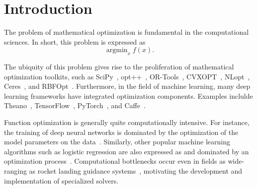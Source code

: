 \section{Introduction}
\label{sec:introduction}

The problem of mathematical optimization is fundamental in the computational
sciences.  In short, this problem is expressed as
%
\begin{equation}
\operatorname{argmin}_x f(x).
\end{equation}

The ubiquity of this problem gives rise to the proliferation of mathematical
optimization toolkits, such as SciPy~\cite{2019arXiv190710121V},
opt++~\cite{meza1994opt++},
OR-Tools~\cite{ortools}, CVXOPT~\cite{vandenberghe2010cvxopt},
NLopt~\cite{johnson2014nlopt}, Ceres~\cite{ceres-solver},
and RBFOpt~\cite{costa2018rbfopt}.
Furthermore, in the field of machine learning, many
deep learning frameworks have integrated optimization
components.  Examples inclulde Theano~\cite{2016arXiv160502688},
TensorFlow~\cite{tensorflow2015-whitepaper}, PyTorch~\cite{NEURIPS2019_9015},
and Caffe~\cite{jia2014caffe}.

Function optimization is generally quite computationally intensive.
For instance, the training of deep neural networks is dominated by
the optimization of the model parameters on the
data~\cite{krizhevsky2012imagenet, lauzon2012introduction}.  Similarly,
other popular machine learning algorithms such as logistic regression are also
expressed as and dominated by an optimization process~\cite{zhang2004solving,
manogaran2018health}.  Computational bottlenecks occur even in fields as
wide-ranging as rocket landing guidance systems~\cite{dueri2016customized},
motivating the development and implementation of specialized solvers.

